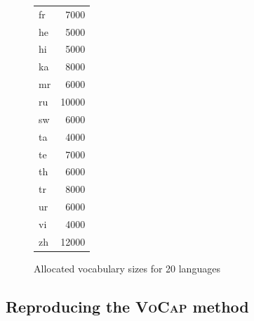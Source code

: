 \begin{figure}[h]
\begin{subtable}{0.32\textwidth}
\begin{tabular}{lr}
            fr & 7000 \\
            he & 5000 \\
            hi & 5000 \\
            ka & 8000 \\
            mr & 6000 \\
            ru & 10000 \\
            sw & 6000 \\
            ta & 4000 \\
            te & 7000 \\
            th & 6000 \\
            tr & 8000 \\
            ur & 6000 \\
            vi & 4000 \\
            zh & 12000 \\
            \bottomrule
        \end{tabular}
        \caption{\citet{zheng_allocating_2021}}
        \label{tab:zheng_allocations}
    \end{subtable}


    \caption{Allocated vocabulary sizes for 20 languages}
    \label{fig:cluster_assignments_k20}
\end{figure}
% 
% 
% 
% 

% 
% 
% 
% 

\subsection{Reproducing the \textsc{VoCap} method}
\label{subsec:reproducing_vocap}



